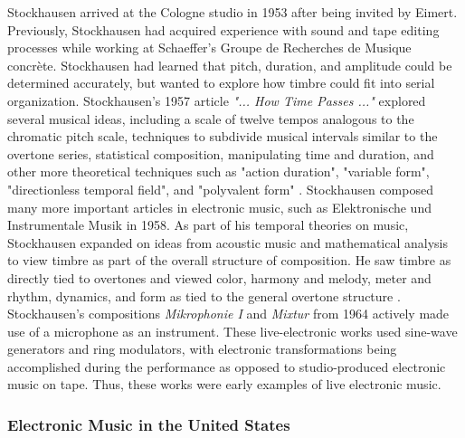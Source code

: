 \documentclass[letterpaper, 12pt]{article}
\begin{document}
%
Stockhausen arrived at the Cologne studio in 1953 after being invited by Eimert.
%
Previously, Stockhausen had acquired experience with sound and tape editing processes while working at Schaeffer's Groupe de Recherches de Musique concrète.
%
Stockhausen had learned that pitch, duration, and amplitude could be determined accurately, but wanted to explore how timbre could fit into serial organization.
%
Stockhausen's 1957 article \textit{"... How Time Passes ..."} explored several musical ideas, including a scale of twelve tempos analogous to the chromatic pitch scale, techniques to subdivide musical intervals similar to the overtone series, statistical composition, manipulating time and duration, and other more theoretical techniques such as "action duration", "variable form", "directionless temporal field", and "polyvalent form" \citep{stockhausen2014texte}.
%
Stockhausen composed many more important articles in electronic music, such as Elektronische und Instrumentale Musik in 1958.
%
As part of his temporal theories on music, Stockhausen expanded on ideas from acoustic music and mathematical analysis to view timbre as part of the overall structure of composition.
%
He saw timbre as directly tied to overtones and viewed color, harmony and melody, meter and rhythm, dynamics, and form as tied to the general overtone structure \citep{morgan1975stockhausen}.
%
Stockhausen's compositions \textit{Mikrophonie I} and \textit{Mixtur} from 1964 actively made use of a microphone as an instrument.
%
These live-electronic works used sine-wave generators and ring modulators, with electronic transformations being accomplished during the performance as opposed to studio-produced electronic music on tape.
%
Thus, these works were early examples of live electronic music.
%

\subsubsection{Electronic Music in the United States}

\end{document}
